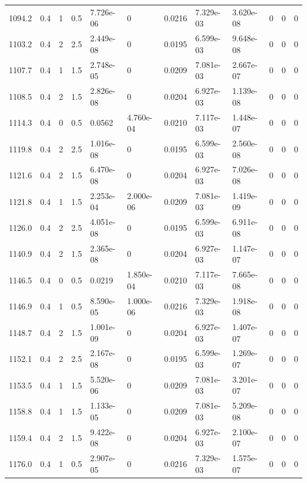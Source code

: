 \documentclass[preview]{standalone}
\begin{document}
{{{\begin{tabular}{L{1.2cm}C{1.2cm} C{0.3cm}C{0.5cm} C{1.4cm}C{1.4cm} C{1.4cm}C{1.4cm} C{1.6cm}C{1.6cm} C{1.6cm}C{1.6cm}}
  1094.2  &   0.4  & 1     & 0.5 &  7.726e-06  & 0  &  0.0216&   7.329e-03& 3.620e-08 & 0   &  0 & 0  \\ 
  1103.2  &   0.4  & 2     & 2.5 &  2.449e-08  & 0  &  0.0195&   6.599e-03& 9.648e-08 & 0   &  0 & 0  \\ 
  1107.7  &   0.4  & 1     & 1.5 &  2.748e-05  & 0  &  0.0209&   7.081e-03& 2.667e-07 & 0   &  0 & 0  \\ 
  1108.5  &   0.4  & 2     & 1.5 &  2.826e-08  & 0  &  0.0204&   6.927e-03& 1.139e-08 & 0   &  0 & 0  \\ 
  1114.3  &   0.4  & 0     & 0.5 &  0.0562  & 4.760e-04  &  0.0210&   7.117e-03& 1.448e-07 & 0   &  0 & 0  \\ 
  1119.8  &   0.4  & 2     & 2.5 &  1.016e-08  & 0  &  0.0195&   6.599e-03& 2.560e-08 & 0   &  0 & 0  \\ 
  1121.6  &   0.4  & 2     & 1.5 &  6.470e-08  & 0  &  0.0204&   6.927e-03& 7.026e-08 & 0   &  0 & 0  \\ 
  1121.8  &   0.4  & 1     & 1.5 &  2.253e-04  & 2.000e-06  &  0.0209&   7.081e-03& 1.419e-09 & 0   &  0 & 0  \\ 
  1126.0  &   0.4  & 2     & 2.5 &  4.051e-08  & 0  &  0.0195&   6.599e-03& 6.911e-08 & 0   &  0 & 0  \\ 
  1140.9  &   0.4  & 2     & 1.5 &  2.365e-08  & 0  &  0.0204&   6.927e-03& 1.147e-07 & 0   &  0 & 0  \\ 
  1146.5  &   0.4  & 0     & 0.5 &  0.0219  & 1.850e-04  &  0.0210&   7.117e-03& 7.665e-08 & 0   &  0 & 0  \\ 
  1146.9  &   0.4  & 1     & 0.5 &  8.590e-05  & 1.000e-06  &  0.0216&   7.329e-03& 1.918e-08 & 0   &  0 & 0  \\ 
  1148.7  &   0.4  & 2     & 1.5 &  1.001e-09  & 0  &  0.0204&   6.927e-03& 1.407e-07 & 0   &  0 & 0  \\ 
  1152.1  &   0.4  & 2     & 2.5 &  2.167e-08  & 0  &  0.0195&   6.599e-03& 1.269e-07 & 0   &  0 & 0  \\ 
  1153.5  &   0.4  & 1     & 1.5 &  5.520e-06  & 0  &  0.0209&   7.081e-03& 3.201e-07 & 0   &  0 & 0  \\ 
  1158.8  &   0.4  & 1     & 1.5 &  1.133e-05  & 0  &  0.0209&   7.081e-03& 5.209e-08 & 0   &  0 & 0  \\ 
  1159.4  &   0.4  & 2     & 1.5 &  9.422e-08  & 0  &  0.0204&   6.927e-03& 2.100e-07 & 0   &  0 & 0  \\ 
  1176.0  &   0.4  & 1     & 0.5 &  2.907e-05  & 0  &  0.0216&   7.329e-03& 1.575e-07 & 0   &  0 & 0  \\ 

\end{tabular}}}}
\end{document}
